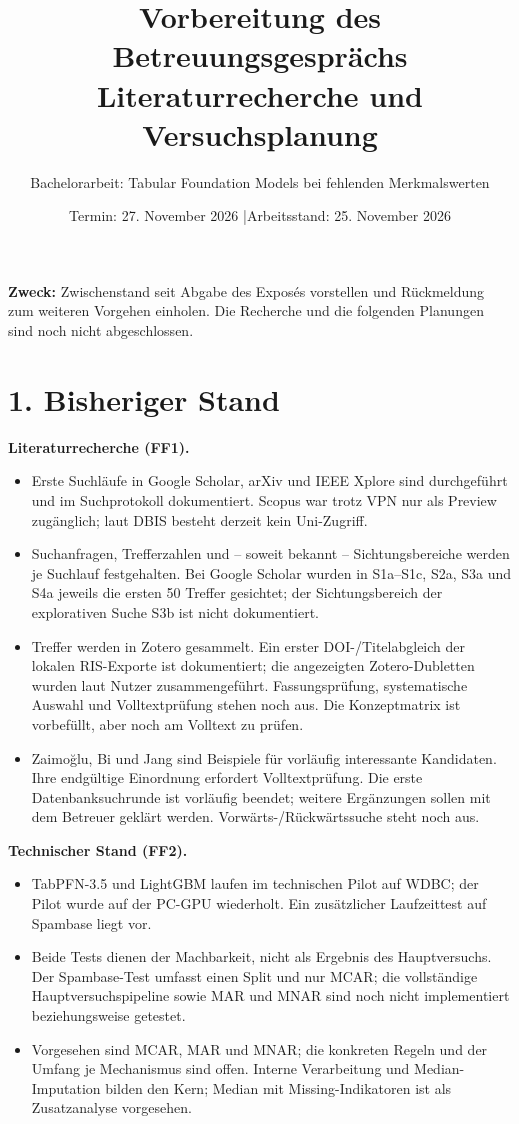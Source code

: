 \documentclass[11pt,a4paper]{article}
\title{Vorbereitung des Betreuungsgesprächs\\
\large Literaturrecherche und Versuchsplanung}
\author{Bachelorarbeit: Tabular Foundation Models bei fehlenden Merkmalswerten}
\date{Termin: 27. November 2026 \quad|\quad Arbeitsstand: 25. November 2026}
\begin{document}
\maketitle

\textbf{Zweck:} Zwischenstand seit Abgabe des Exposés vorstellen und
Rückmeldung zum weiteren Vorgehen einholen. Die Recherche und die folgenden
Planungen sind noch nicht abgeschlossen.

\section*{1. Bisheriger Stand}

\textbf{Literaturrecherche (FF1).}
\begin{itemize}
  \item Erste Suchläufe in Google Scholar, arXiv und IEEE Xplore sind
  durchgeführt und im Suchprotokoll dokumentiert. Scopus war trotz VPN nur
  als Preview zugänglich; laut DBIS besteht derzeit kein Uni-Zugriff.
  \item Suchanfragen, Trefferzahlen und -- soweit bekannt -- Sichtungsbereiche
  werden je Suchlauf festgehalten. Bei Google Scholar wurden in S1a--S1c,
  S2a, S3a und S4a jeweils die ersten 50 Treffer gesichtet; der Sichtungsbereich
  der explorativen Suche S3b ist nicht dokumentiert.
  \item Treffer werden in Zotero gesammelt. Ein erster DOI-/Titelabgleich der
  lokalen RIS-Exporte ist dokumentiert; die angezeigten Zotero-Dubletten
  wurden laut Nutzer zusammengeführt. Fassungsprüfung, systematische Auswahl
  und Volltextprüfung stehen noch aus. Die Konzeptmatrix ist vorbefüllt, aber
  noch am Volltext zu prüfen.
  \item Zaimoğlu, Bi und Jang sind Beispiele für vorläufig interessante
  Kandidaten. Ihre endgültige   Einordnung erfordert Volltextprüfung. Die erste Datenbanksuchrunde ist
  vorläufig beendet; weitere Ergänzungen sollen mit dem Betreuer geklärt
  werden. Vorwärts-/Rückwärtssuche steht noch aus.
\end{itemize}

\textbf{Technischer Stand (FF2).}
\begin{itemize}
  \item TabPFN-3.5 und LightGBM laufen im technischen Pilot auf WDBC; der
  Pilot wurde auf der PC-GPU wiederholt. Ein zusätzlicher Laufzeittest auf
  Spambase liegt vor.
  \item Beide Tests dienen der Machbarkeit, nicht als Ergebnis des
  Hauptversuchs. Der Spambase-Test umfasst einen Split und nur MCAR; die
  vollständige Hauptversuchspipeline sowie MAR und MNAR sind noch nicht
  implementiert beziehungsweise getestet.
  \item Vorgesehen sind MCAR, MAR und MNAR; die konkreten Regeln und der
  Umfang je Mechanismus sind offen. Interne Verarbeitung und Median-Imputation
  bilden den Kern; Median mit Missing-Indikatoren ist als Zusatzanalyse
  vorgesehen.
\end{itemize}
\end{document}
